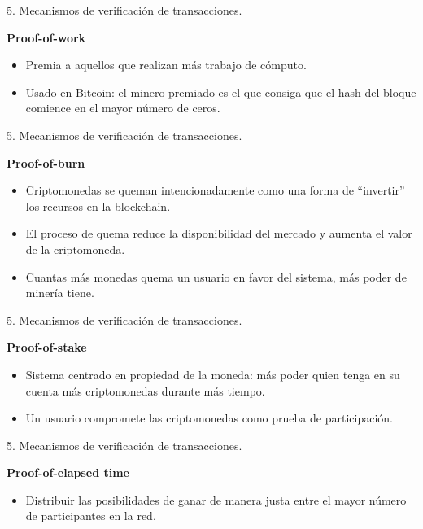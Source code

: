 \documentclass[10pt, xcolor=table]{beamer}
\begin{document}
\begin{frame}{5. Mecanismos de verificación de transacciones. }
\begin{center}
	\large{\textbf{Proof-of-work}}
\end{center}
\begin{itemize}
	\item Premia a aquellos que realizan más trabajo de cómputo.
	\item Usado en Bitcoin: el minero premiado es el que consiga que el hash del bloque comience en el mayor número de ceros.
\end{itemize}
\end{frame}

\begin{frame}{5. Mecanismos de verificación de transacciones. }
\begin{center}
	\large{\textbf{Proof-of-burn}}
\end{center}
\begin{itemize}
	\item Criptomonedas se queman intencionadamente como una forma de ``invertir'' los recursos en la blockchain.
	\item El proceso de quema reduce la disponibilidad del mercado y aumenta el valor de la criptomoneda.
	\item Cuantas más monedas quema un usuario en favor del sistema, más poder de minería tiene.
\end{itemize}
\end{frame}

\begin{frame}{5. Mecanismos de verificación de transacciones. }
\begin{center}
	\large{\textbf{Proof-of-stake}}
\end{center}
\begin{itemize}
	\item Sistema centrado en propiedad de la moneda: más poder quien tenga en su cuenta más criptomonedas durante más tiempo.
	\item Un usuario compromete las criptomonedas como prueba de participación.
\end{itemize}
\end{frame}

\begin{frame}{5. Mecanismos de verificación de transacciones. }
\begin{center}
	\large{\textbf{Proof-of-elapsed time}}
\end{center}
\begin{itemize}
	\item Distribuir las posibilidades de ganar de manera justa entre el mayor número de participantes en la red.
\end{itemize}
\end{frame}
\end{document}
